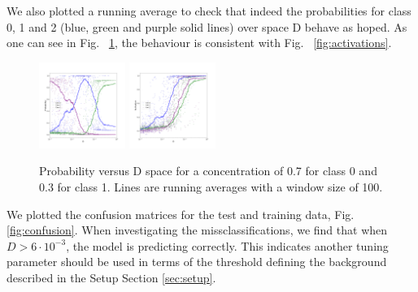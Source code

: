 \documentclass{article}
\begin{document}
%
We also plotted a running average to check that indeed the probabilities for class 0, 1 and 2 (blue, green and purple solid lines) over space D behave as hoped. As one can see in Fig. ~\ref{fig:Dspace}, the behaviour is consistent with Fig. ~\ref{fig:activations}.
%
\begin{figure}[H]
	\centering
	\includegraphics[width=0.25\textwidth]{DNN_D_vs_prob_6_2.png} \hspace*{-.5cm}
	\includegraphics[width=0.25\textwidth]{DNN_D_vs_act_6.png}	
	\caption{Probability versus D space for a concentration of 0.7 for class 0 and 0.3 for class 1. Lines are running averages with a window size of 100.}
	\label{fig:Dspace}
\end{figure}
%
We plotted the confusion matrices for the test and training data, Fig. \ref{fig:confusion}. When investigating the missclassifications, we find that when $D > 6\cdot 10^{-3}$, the model is predicting correctly. This indicates another tuning parameter should be used in terms of the threshold defining the background described in the Setup Section \ref{sec:setup}.


\end{document}
